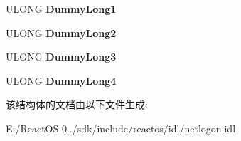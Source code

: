 \begin{DoxyCompactItemize}
\mbox{\label{struct___n_e_t_l_o_g_o_n___d_e_l_t_a___a_c_c_o_u_n_t_s_aff6f577609ae02df2f551fb96bb6a373}} 
U\+L\+O\+NG {\bfseries Dummy\+Long1}
\item 
\mbox{\label{struct___n_e_t_l_o_g_o_n___d_e_l_t_a___a_c_c_o_u_n_t_s_ab1e9889c81f0f2976471284ea1d69b71}} 
U\+L\+O\+NG {\bfseries Dummy\+Long2}
\item 
\mbox{\label{struct___n_e_t_l_o_g_o_n___d_e_l_t_a___a_c_c_o_u_n_t_s_a16c03b4c28c4e990b998d49043194a53}} 
U\+L\+O\+NG {\bfseries Dummy\+Long3}
\item 
\mbox{\label{struct___n_e_t_l_o_g_o_n___d_e_l_t_a___a_c_c_o_u_n_t_s_a858a36ef17c3841c184d78917a72e526}} 
U\+L\+O\+NG {\bfseries Dummy\+Long4}
\end{DoxyCompactItemize}


该结构体的文档由以下文件生成\+:\begin{DoxyCompactItemize}
\item 
E\+:/\+React\+O\+S-\/0../sdk/include/reactos/idl/netlogon.\+idl\end{DoxyCompactItemize}
